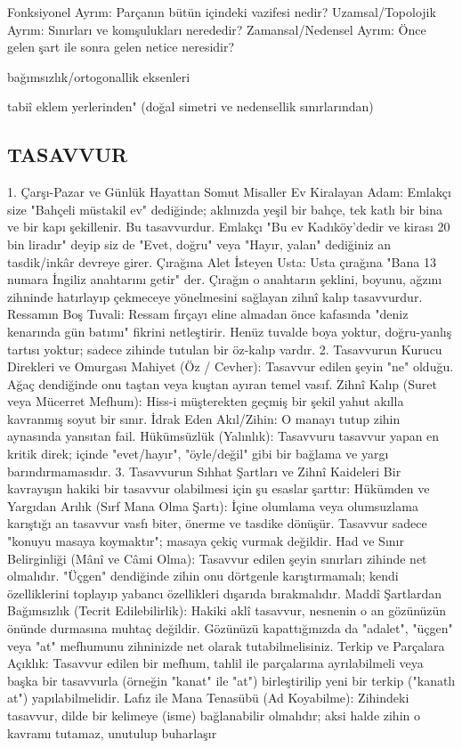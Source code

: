 \documentclass[11pt,a4paper]{article}
\begin{document}
Fonksiyonel Ayrım: Parçanın bütün içindeki vazifesi nedir?
 Uzamsal/Topolojik Ayrım: Sınırları ve komşulukları nerededir?
 Zamansal/Nedensel Ayrım: Önce gelen şart ile sonra gelen netice neresidir?

bağımsızlık/ortogonallik eksenleri

tabiî eklem yerlerinden" (doğal simetri ve nedensellik sınırlarından) 




\subsection{TASAVVUR}


1. Çarşı-Pazar ve Günlük Hayattan Somut Misaller
 Ev Kiralayan Adam: Emlakçı size "Bahçeli müstakil ev" dediğinde; aklınızda yeşil bir bahçe, tek katlı bir bina ve bir kapı şekillenir. Bu tasavvurdur. Emlakçı "Bu ev Kadıköy'dedir ve kirası 20 bin liradır" deyip siz de "Evet, doğru" veya "Hayır, yalan" dediğiniz an tasdik/inkâr devreye girer.
 Çırağına Alet İsteyen Usta: Usta çırağına "Bana 13 numara İngiliz anahtarını getir" der. Çırağın o anahtarın şeklini, boyunu, ağzını zihninde hatırlayıp çekmeceye yönelmesini sağlayan zihnî kalıp tasavvurdur.
 Ressamın Boş Tuvali: Ressam fırçayı eline almadan önce kafasında "deniz kenarında gün batımı" fikrini netleştirir. Henüz tuvalde boya yoktur, doğru-yanlış tartısı yoktur; sadece zihinde tutulan bir öz-kalıp vardır.
2. Tasavvurun Kurucu Direkleri ve Omurgası
 Mahiyet (Öz / Cevher): Tasavvur edilen şeyin "ne" olduğu. Ağaç dendiğinde onu taştan veya kuştan ayıran temel vasıf.
 Zihnî Kalıp (Suret veya Mücerret Mefhum): Hiss-i müşterekten geçmiş bir şekil yahut akılla kavranmış soyut bir sınır.
 İdrak Eden Akıl/Zihin: O manayı tutup zihin aynasında yansıtan fail.
 Hükümsüzlük (Yalınlık): Tasavvuru tasavvur yapan en kritik direk; içinde "evet/hayır", "öyle/değil" gibi bir bağlama ve yargı barındırmamasıdır.
3. Tasavvurun Sıhhat Şartları ve Zihnî Kaideleri
Bir kavrayışın hakiki bir tasavvur olabilmesi için şu esaslar şarttır:
 Hükümden ve Yargıdan Arılık (Sırf Mana Olma Şartı):
İçine olumlama veya olumsuzlama karıştığı an tasavvur vasfı biter, önerme ve tasdike dönüşür. Tasavvur sadece "konuyu masaya koymaktır"; masaya çekiç vurmak değildir.
 Had ve Sınır Belirginliği (Mânî ve Câmi Olma):
Tasavvur edilen şeyin sınırları zihinde net olmalıdır. "Üçgen" dendiğinde zihin onu dörtgenle karıştırmamalı; kendi özelliklerini toplayıp yabancı özellikleri dışarıda bırakmalıdır.
 Maddî Şartlardan Bağımsızlık (Tecrit Edilebilirlik):
Hakiki aklî tasavvur, nesnenin o an gözünüzün önünde durmasına muhtaç değildir. Gözünüzü kapattığınızda da "adalet", "üçgen" veya "at" mefhumunu zihninizde net olarak tutabilmelisiniz.
 Terkip ve Parçalara Açıklık:
Tasavvur edilen bir mefhum, tahlil ile parçalarına ayrılabilmeli veya başka bir tasavvurla (örneğin "kanat" ile "at") birleştirilip yeni bir terkip ("kanatlı at") yapılabilmelidir.
 Lafız ile Mana Tenasübü (Ad Koyabilme):
Zihindeki tasavvur, dilde bir kelimeye (isme) bağlanabilir olmalıdır; aksi halde zihin o kavramı tutamaz, unutulup buharlaşır
\end{document}
